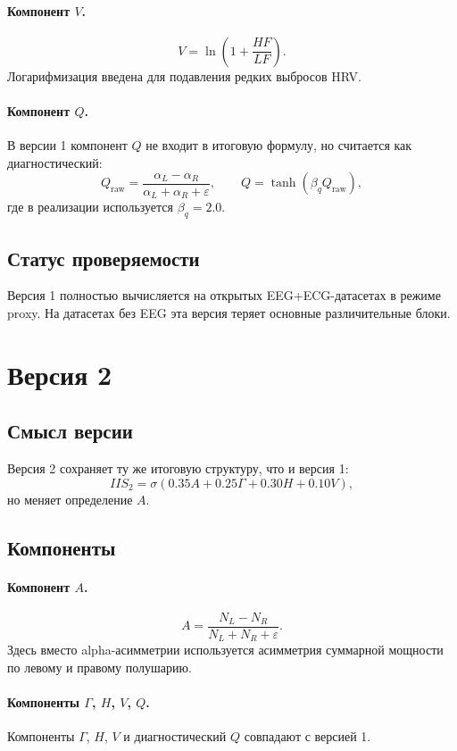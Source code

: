 \documentclass[12pt,a4paper]{article}
\begin{document}
\paragraph{Компонент $V$.}
\[
V = \ln\!\left(1 + \frac{HF}{LF}\right).
\]
Логарифмизация введена для подавления редких выбросов HRV.

\paragraph{Компонент $Q$.}
В версии 1 компонент $Q$ не входит в итоговую формулу, но считается как диагностический:
\[
Q_{\mathrm{raw}} = \frac{\alpha_L - \alpha_R}{\alpha_L + \alpha_R + \varepsilon},
\qquad
Q = \tanh(\beta_q Q_{\mathrm{raw}}),
\]
где в реализации используется $\beta_q = 2.0$.

\subsection{Статус проверяемости}
Версия 1 полностью вычисляется на открытых EEG+ECG-датасетах в режиме proxy. На датасетах без EEG эта версия теряет основные различительные блоки.

\section{Версия 2}
\subsection{Смысл версии}
Версия 2 сохраняет ту же итоговую структуру, что и версия 1:
\[
IIS_2 = \sigma\!\left(0.35A + 0.25\Gamma + 0.30H + 0.10V\right),
\]
но меняет определение $A$.

\subsection{Компоненты}
\paragraph{Компонент $A$.}
\[
A = \frac{N_L - N_R}{N_L + N_R + \varepsilon}.
\]
Здесь вместо alpha-асимметрии используется асимметрия суммарной мощности по левому и правому полушарию.

\paragraph{Компоненты $\Gamma$, $H$, $V$, $Q$.}
Компоненты $\Gamma$, $H$, $V$ и диагностический $Q$ совпадают с версией 1.
\end{document}
